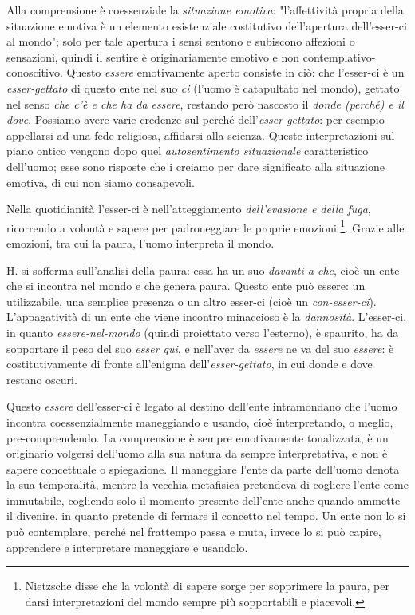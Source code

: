 \documentclass[a4paper,12pt,oneside]{article}%
\begin{document}
Alla comprensione è coessenziale la \textit{situazione emotiva}: "l'affettività propria della situazione emotiva è un elemento esistenziale costitutivo dell'apertura dell'esser-ci al mondo"; solo per tale apertura i sensi sentono e subiscono affezioni o sensazioni, quindi il sentire è originariamente emotivo e non contemplativo-conoscitivo. Questo \textit{essere} emotivamente aperto consiste in ciò: che l'esser-ci è un \textit{esser-gettato} di questo ente nel suo \textit{ci} (l'uomo è catapultato nel mondo), gettato nel senso \textit{che c'è e che ha da essere}, restando però nascosto il \textit{donde (perché) e il dove}. Possiamo avere varie credenze sul perché dell'\textit{esser-gettato}: per esempio appellarsi ad una fede religiosa, affidarsi alla scienza. Queste interpretazioni sul piano ontico vengono dopo quel \textit{autosentimento situazionale} caratteristico dell'uomo; esse sono risposte che i creiamo per dare significato alla situazione emotiva, di cui non siamo consapevoli.

Nella quotidianità l'esser-ci è nell'atteggiamento \textit{dell'evasione e della fuga}, ricorrendo a volontà e sapere per padroneggiare le proprie emozioni \footnote{Nietzsche disse che la volontà di sapere sorge per sopprimere la paura, per darsi interpretazioni del mondo sempre più sopportabili e piacevoli.}. Grazie alle emozioni, tra cui la paura, l'uomo interpreta il mondo.

H. si sofferma sull'analisi della paura: essa ha un suo \textit{davanti-a-che}, cioè un ente che si incontra nel mondo e che genera paura. Questo ente può essere: un utilizzabile, una semplice presenza o un altro esser-ci (cioè un \textit{con-esser-ci}). L'appagatività di un ente che viene incontro minaccioso è la \textit{dannosità}. L'esser-ci, in quanto \textit{essere-nel-mondo} (quindi proiettato verso l'esterno), è spaurito, ha da sopportare il peso del suo \textit{esser qui}, e nell'aver da \textit{essere} ne va del suo \textit{essere}: è costitutivamente di fronte all'enigma dell'\textit{esser-gettato}, in cui donde e dove  restano oscuri.

Questo \textit{essere} dell'esser-ci è legato al destino dell'ente intramondano che l'uomo incontra coessenzialmente maneggiando e usando, cioè interpretando, o meglio, pre-comprendendo. La comprensione è sempre emotivamente tonalizzata, è un originario volgersi dell'uomo alla sua natura da sempre interpretativa, e non è sapere concettuale o spiegazione. Il maneggiare l'ente da parte dell'uomo denota la sua temporalità, mentre la vecchia metafisica pretendeva di cogliere l'ente come immutabile, cogliendo solo il momento presente dell'ente anche quando ammette il divenire, in quanto pretende di fermare il concetto nel tempo. Un ente non lo si può contemplare, perché nel frattempo passa e muta, invece lo si può capire, apprendere e interpretare maneggiare e usandolo.
\end{document}
